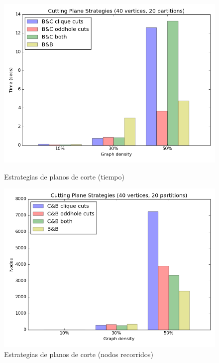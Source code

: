 \begin{figure}[h]
  \centering
  \begin{minipage}[b]{0.49\textwidth}
    \includegraphics[width=\textwidth]{img/5-cuts_v40_p20_i1_l40_t1_b0.png}
    \caption{Estrategias de planos de corte (tiempo)}
  \end{minipage}
  \hfill
  \begin{minipage}[b]{0.49\textwidth}
    \includegraphics[width=\textwidth]{img/5-cuts_v40_p20_i1_l40_t1_b0_nodes.png}
    \caption{Estrategias de planos de corte (nodos recorridos)}
  \end{minipage}
\end{figure}

